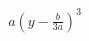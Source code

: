 \documentclass[preview]{standalone}
\begin{document}
\begin{align*}
a\left(y-\frac{b}{3a}\right)^3
\end{align*}
\end{document}
